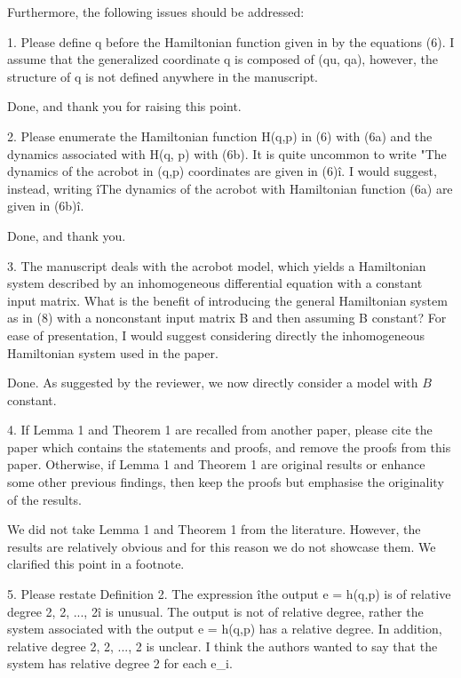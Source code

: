 \documentclass[11pt,letter]{article}
\newenvironment{myquote}{%
\bigskip%
\begin{tcolorbox}[]\footnotesize}{%
\end{tcolorbox}%
\bigskip}
\begin{document}
\begin{myquote}
Furthermore, the following issues should be addressed:

1.	Please define q before the Hamiltonian function given in by the
equations (6). I assume that the generalized coordinate q is composed
of (qu, qa), however, the structure of q is not defined anywhere in the
manuscript.
\end{myquote}

Done, and thank you for raising this point.

\begin{myquote}
 2.	Please enumerate the Hamiltonian function H(q,p) in (6) with
(6a) and the dynamics associated with H(q, p) with (6b). It is quite
uncommon to write "The dynamics of the acrobot in (q,p) coordinates are
given in (6)î. I would suggest, instead, writing îThe dynamics of the
acrobot with Hamiltonian function (6a) are given in (6b)î.  
\end{myquote}

Done, and thank you.

\begin{myquote}
3.	The manuscript deals with the acrobot model, which yields a
Hamiltonian system described by an inhomogeneous differential equation
with a constant input matrix. What is the benefit of introducing the
general Hamiltonian system as in (8) with a nonconstant input matrix B
and then assuming B constant? For ease of presentation, I would suggest
considering directly the inhomogeneous Hamiltonian system used in the
paper.  
\end{myquote}

Done. As suggested by the reviewer, we now directly consider a model with \(B\) constant.


\begin{myquote}
4.	If Lemma 1 and Theorem 1 are recalled from another paper,
please cite the paper which contains the statements and proofs, and
remove the proofs from this paper. Otherwise, if Lemma 1 and Theorem 1
are original results or enhance some other previous findings, then keep
the proofs but emphasise the originality of the results.  
\end{myquote}

We did not take Lemma 1 and Theorem 1 from the literature. However,
the results are relatively obvious and for this reason we do not
showcase them. We clarified this point in a footnote.

\begin{myquote}
5.	Please restate Definition 2. The expression îthe output e =
h(q,p) is of relative degree 2, 2, ..., 2î is unusual. The output is
not of relative degree, rather the system associated with the output e
= h(q,p) has a relative degree. In addition, relative degree 2, 2, ...,
2 is unclear. I think the authors wanted to say that the system has
relative degree 2 for each e\_i.
\end{myquote}
\end{document}
